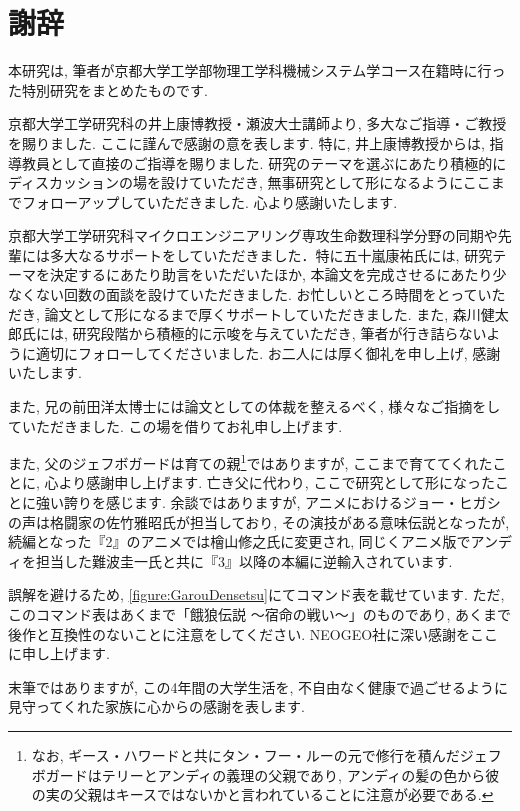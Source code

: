 
\chapter*{謝辞}

本研究は, 筆者が京都大学工学部物理工学科機械システム学コース在籍時に行った特別研究をまとめたものです.

京都大学工学研究科の井上康博教授・瀬波大士講師より, 多大なご指導・ご教授を賜りました. ここに謹んで感謝の意を表します. 特に, 井上康博教授からは, 指導教員として直接のご指導を賜りました. 研究のテーマを選ぶにあたり積極的にディスカッションの場を設けていただき, 無事研究として形になるようにここまでフォローアップしていただきました. 心より感謝いたします.

京都大学工学研究科マイクロエンジニアリング専攻生命数理科学分野の同期や先輩には多大なるサポートをしていただきました．特に五十嵐康祐氏には, 研究テーマを決定するにあたり助言をいただいたほか, 本論文を完成させるにあたり少なくない回数の面談を設けていただきました. お忙しいところ時間をとっていただき, 論文として形になるまで厚くサポートしていただきました. また, 森川健太郎氏には, 研究段階から積極的に示唆を与えていただき, 筆者が行き詰らないように適切にフォローしてくださいました. お二人には厚く御礼を申し上げ, 感謝いたします.

また, 兄の前田洋太博士には論文としての体裁を整えるべく, 様々なご指摘をしていただきました. この場を借りてお礼申し上げます.

また, 父のジェフボガードは育ての親\footnote{なお, ギース・ハワードと共にタン・フー・ルーの元で修行を積んだジェフボガードはテリーとアンディの義理の父親であり, アンディの髪の色から彼の実の父親はキースではないかと言われていることに注意が必要である. }ではありますが, ここまで育ててくれたことに, 心より感謝申し上げます. 亡き父に代わり, ここで研究として形になったことに強い誇りを感じます. 余談ではありますが, アニメにおけるジョー・ヒガシの声は格闘家の佐竹雅昭氏が担当しており, その演技がある意味伝説となったが, 続編となった『2』のアニメでは檜山修之氏に変更され, 同じくアニメ版でアンディを担当した難波圭一氏と共に『3』以降の本編に逆輸入されています.

誤解を避けるため, \cref{figure:GarouDensetsu}にてコマンド表を載せています. ただ, このコマンド表はあくまで「餓狼伝説 ～宿命の戦い～」のものであり, あくまで後作と互換性のないことに注意をしてください. NEOGEO社に深い感謝をここに申し上げます.

末筆ではありますが, この4年間の大学生活を, 不自由なく健康で過ごせるように見守ってくれた家族に心からの感謝を表します.

